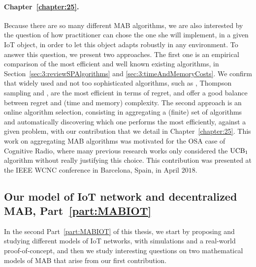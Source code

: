 \paragraph{Chapter~\ref{chapter:25}.}
%
Because there are so many different MAB algorithms, we are also interested by the question of how practitioner can chose the one she will implement, in a given IoT object, in order to let this object adapts robustly in any environment.
To answer this question, we present two approaches.
The first one is an empirical comparison of the most efficient and well known existing algorithms, in Section~\ref{sec:3:reviewSPAlgorithms} and \ref{sec:3:timeAndMemoryCosts}.
We confirm that widely used and not too sophisticated algorithms, such as \UCB{} \cite{Auer02}, Thompson sampling \cite{Thompson33} and \klUCB{} \cite{KLUCBJournal}, are the most efficient in terms of regret, and offer a good balance between regret and (time and memory) complexity.
The second approach is an online algorithm selection, consisting in aggregating a (finite) set of algorithms and automatically discovering which one performs the most efficiently, against a given problem, with our contribution \Aggr{} that we detail in Chapter~\ref{chapter:25}.
This work on aggregating MAB algorithms was motivated for the OSA case of Cognitive Radio, where many previous research works only considered the $\mathrm{UCB}_1$ algorithm without really justifying this choice.
This contribution was presented at the IEEE WCNC conference in Barcelona, Spain, in April $2018$.


\subsection{Our model of IoT network and decentralized MAB, Part~\ref{part:MABIOT}}

In the second Part~\ref{part:MABIOT} of this thesis, we start by proposing and studying different models of IoT networks, with simulations and a real-world proof-of-concept, and then we study interesting questions on two mathematical models of MAB that arise from our first contribution.


